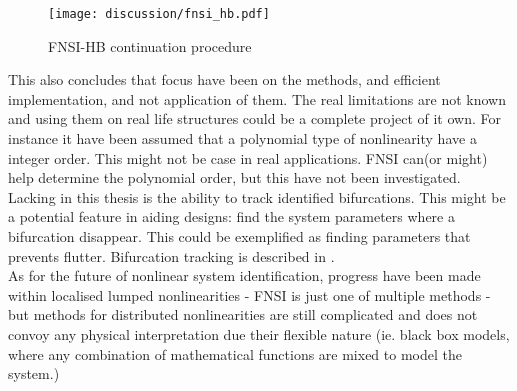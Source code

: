\begin{figure}[!ht]
  \centering
  \texttt{[image: discussion/fnsi\_hb.pdf]}
  \caption{FNSI-HB continuation procedure}
  \label{fig:fnsi_hb}
\end{figure}

This also concludes that focus have been on the methods, and efficient
implementation, and not application of them. The real limitations are not known
and using them on real life structures could be a complete project of it own.
For instance it have been assumed that a polynomial type of nonlinearity have a
integer order. This might not be case in real applications. FNSI can(or might) help
determine the polynomial order, but this have not been investigated.\\

Lacking in this thesis is the ability to track identified bifurcations.
This might be a potential feature in aiding designs: find the system parameters
where a bifurcation disappear. This could be exemplified as finding parameters
that prevents flutter. Bifurcation tracking is described in
\autocite{detroux2015a}. \\

As for the future of nonlinear system identification, progress have been made
within localised lumped nonlinearities - FNSI is just one of multiple methods - but
methods for distributed nonlinearities are still complicated and does not
convoy any physical interpretation due their flexible nature (ie. black box
models, where any combination of mathematical functions are mixed to model the
system.)\\



